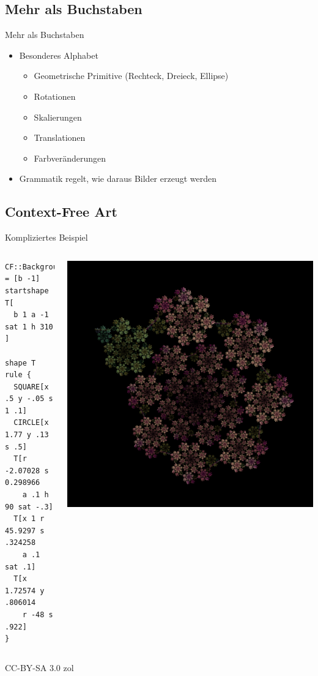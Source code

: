 \documentclass{beamer}
\theoremstyle{example}
\begin{document}
\subsection{Mehr als Buchstaben}
\begin{frame}{Mehr als Buchstaben}
  \begin{itemize}
  \item Besonderes Alphabet
    \begin{itemize}
    \item Geometrische Primitive (Rechteck, Dreieck, Ellipse)
    \item Rotationen
    \item Skalierungen
    \item Translationen
    \item Farbveränderungen
    \end{itemize}
  \item Grammatik regelt, wie daraus Bilder erzeugt werden
  \end{itemize}
\end{frame}

\subsection{Context-Free Art}
\begin{frame}[fragile]{Kompliziertes Beispiel}
\begin{columns}
\column{4cm}
\footnotesize{
\begin{lstlisting}
CF::Background = [b -1]
startshape T[
  b 1 a -1 sat 1 h 310
]

shape T
rule {
  SQUARE[x .5 y -.05 s 1 .1]
  CIRCLE[x 1.77 y .13 s .5]
  T[r -2.07028 s 0.298966
    a .1 h 90 sat -.3]
  T[x 1 r 45.9297 s .324258
    a .1 sat .1]
  T[x 1.72574 y .806014
    r -48 s .922]
} 
\end{lstlisting}
}
\column{6cm}
\hfill\includegraphics[width=\linewidth]{./images/beispiel.png}
\end{columns}
\tiny
\hfill CC-BY-SA 3.0 zol
\end{frame}
\end{document}
